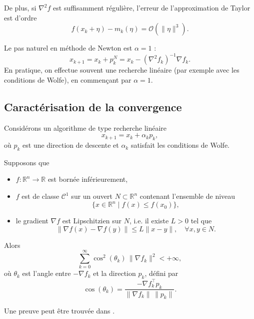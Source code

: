 De plus, si $\nabla^2 f$ est suffisamment régulière, l’erreur de l’approximation
de Taylor est d’ordre
\[
    f(x_k + \eta) - m_k(\eta) = \mathcal{O}(\|\eta\|^3).
\]

\begin{remarque}
Le pas naturel en méthode de Newton est $\alpha = 1$ :
\[
    x_{k+1} = x_k + p_k^N = x_k - (\nabla^2 f_k)^{-1}\nabla f_k.
\]
En pratique, on effectue souvent une recherche linéaire (par exemple avec les
conditions de Wolfe), en commençant par $\alpha=1$.
\end{remarque}

\subsection{Caractérisation de la convergence}
\label{subsec:2.4.3}

Considérons un algorithme de type recherche linéaire
\[
    x_{k+1} = x_k + \alpha_k p_k,
\]
où $p_k$ est une direction de descente et $\alpha_k$ satisfait les conditions de Wolfe.

\begin{theoreme}[Zoutendijk]
\label{thm:Zoutendijk}
Supposons que
\begin{itemize}
    \item $f : \mathbb{R}^n \to \mathbb{R}$ est bornée inférieurement,
    \item $f$ est de classe $\mathcal{C}^1$ sur un ouvert $N \subset \mathbb{R}^n$
    contenant l’ensemble de niveau
    \[
        \{ x \in \mathbb{R}^n \;|\; f(x) \le f(x_0)\},
    \]
    \item le gradient $\nabla f$ est Lipschitzien sur $N$, i.e. il existe $L>0$ tel que
    \[
        \|\nabla f(x) - \nabla f(y)\| \le L \|x-y\|,
        \quad \forall x,y \in N.
    \]
\end{itemize}
Alors
\begin{equation}
    \sum_{k=0}^{\infty} \cos^2(\theta_k)\,\|\nabla f_k\|^2 < +\infty,
\end{equation}
où $\theta_k$ est l’angle entre $- \nabla f_k$ et la direction $p_k$, défini par
\[
    \cos(\theta_k)
    = \frac{-\nabla f_k^\top p_k}{\|\nabla f_k\|\,\|p_k\|}.
\]
\end{theoreme}

\begin{remarque}
Une preuve peut être trouvée dans \cite{nocedal2006numerical}.
\end{remarque}

